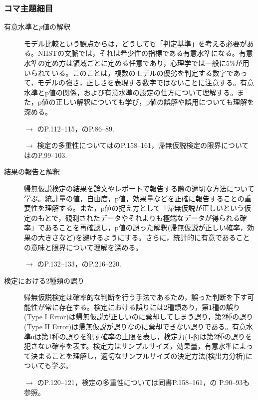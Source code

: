 \subsubsection{コマ主題細目}
\begin{description}

	\item[有意水準と$p$値の解釈]
	モデル比較という観点からは，どうしても「判定基準」を考える必要がある。NHSTの文脈では，それは希少性の指標である有意水準になる。有意水準の定め方は領域ごとに定める任意であり，心理学では一般に5\%が用いられている。このことは，複数のモデルの優劣を判定する数字であって，モデルの強さ，正しさを表現する数字ではないことに注意する。有意水準とp値の関係，および有意水準の設定の仕方について理解する。また，p値の正しい解釈についても学び，p値の誤解や誤用についても理解を深める。
	      \begin{flushright}
		      $\to$ \textcite{Yamada2004}のP.112--115，\textcite{Kawabata201408}のP.86--89.
	      \end{flushright}
	      \begin{flushright}
		      $\to$ 検定の多重性については\textcite{Yamada2004}のP.158--161，帰無仮説検定の限界については\textcite{Kawabata201408}のP.99--103.
	      \end{flushright}
	
		  
	\item[結果の報告と解釈] 帰無仮説検定の結果を論文やレポートで報告する際の適切な方法について学ぶ。統計量の値，自由度，p値，効果量などを正確に報告することの重要性を理解する。また，p値の捉え方として「帰無仮説が正しいという仮定のもとで，観測されたデータやそれよりも極端なデータが得られる確率」であることを再確認し，p値の誤った解釈(帰無仮説が正しい確率，効果の大きさなど)を避けるようにする。さらに，統計的に有意であることの意味と限界について理解を深める。
	      \begin{flushright}
		      $\to$ \textcite{Yamada2004}のP.132--133，\textcite{Yamauchi201001}のP.216--220.
	      \end{flushright}

	\item[検定における2種類の誤り] 帰無仮説検定は確率的な判断を行う手法であるため，誤った判断を下す可能性が常に存在する。検定における誤りには2種類あり，第1種の誤り(Type I Error)は帰無仮説が正しいのに棄却してしまう誤り，第2種の誤り(Type II Error)は帰無仮説が誤りなのに棄却できない誤りである。有意水準αは第1種の誤りを犯す確率の上限を表し，検定力(1-β)は第2種の誤りを犯さない確率を表す。検定力はサンプルサイズ，効果量，有意水準によって決まることを理解し，適切なサンプルサイズの決定方法(検出力分析)についても学ぶ。
	      \begin{flushright}
		      $\to$ \textcite{Yamada2004}のP.120--121，検定の多重性については同書P.158--161，\textcite{Kawabata201408}の P.90--93も参照。
	      \end{flushright}


\end{description}
